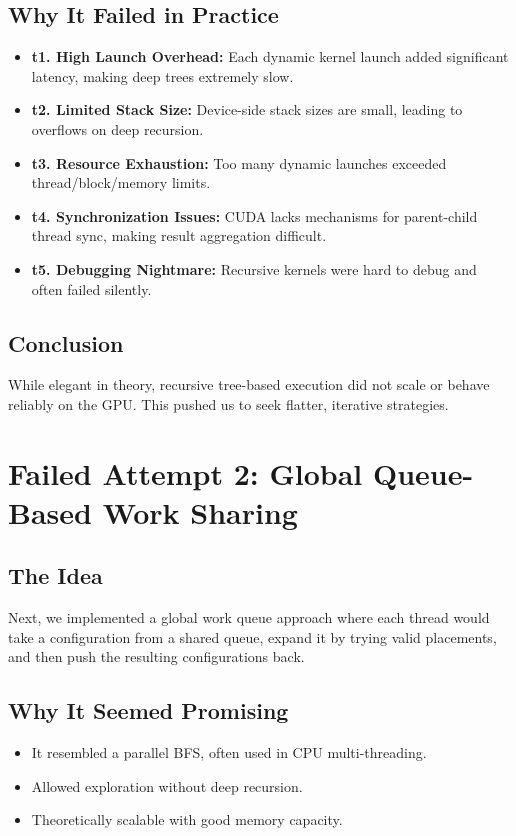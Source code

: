\documentclass[12pt]{article}
\begin{document}
\subsection{Why It Failed in Practice}
\begin{itemize}
    \item \textbf{t1. High Launch Overhead:} Each dynamic kernel launch added significant latency, making deep trees extremely slow.
    \item \textbf{t2. Limited Stack Size:} Device-side stack sizes are small, leading to overflows on deep recursion.
    \item \textbf{t3. Resource Exhaustion:} Too many dynamic launches exceeded thread/block/memory limits.
    \item \textbf{t4. Synchronization Issues:} CUDA lacks mechanisms for parent-child thread sync, making result aggregation difficult.
    \item \textbf{t5. Debugging Nightmare:} Recursive kernels were hard to debug and often failed silently.
\end{itemize}

\subsection{Conclusion}
While elegant in theory, recursive tree-based execution did not scale or behave reliably on the GPU. This pushed us to seek flatter, iterative strategies.

\section{Failed Attempt 2: Global Queue-Based Work Sharing}

\subsection{The Idea}
Next, we implemented a global work queue approach where each thread would take a configuration from a shared queue, expand it by trying valid placements, and then push the resulting configurations back.

\subsection{Why It Seemed Promising}
\begin{itemize}
    \item It resembled a parallel BFS, often used in CPU multi-threading.
    \item Allowed exploration without deep recursion.
    \item Theoretically scalable with good memory capacity.
\end{itemize}
\end{document}
